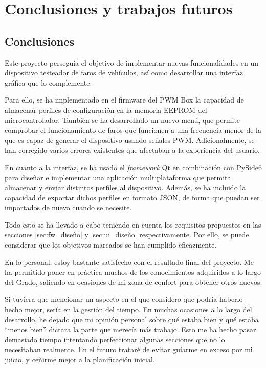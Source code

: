 \chapter{Conclusiones y trabajos futuros}

\section{Conclusiones}

Este proyecto perseguía el objetivo de implementar nuevas funcionalidades en un dispositivo testeador de faros de vehículos, así como desarrollar una interfaz gráfica que lo complemente.

Para ello, se ha implementado en el firmware del PWM Box la capacidad de almacenar perfiles de configuración en la memoria EEPROM del microcontrolador. También se ha desarrollado un nuevo menú, que permite comprobar el funcionamiento de faros que funcionen a una frecuencia menor de la que es capaz de generar el dispositivo usando señales PWM. Adicionalmente, se han corregido varios errores existentes que afectaban a la experiencia del usuario.

En cuanto a la interfaz, se ha usado el \textit{framework} Qt en combinación con PySide6 para diseñar e implementar una aplicación multiplataforma que permita almacenar y enviar distintos perfiles al dispositivo. Además, se ha incluido la capacidad de exportar dichos perfiles en formato JSON, de forma que puedan ser importados de nuevo cuando se necesite.

Todo esto se ha llevado a cabo teniendo en cuenta los requisitos propuestos en las secciones \ref{sec:fw_diseño} y \ref{sec:ui_diseño} respectivamente. Por ello, se puede considerar que los objetivos marcados se han cumplido eficazmente.

En lo personal, estoy bastante satisfecho con el resultado final del proyecto. Me ha permitido poner en práctica muchos de los conocimientos adquiridos a lo largo del Grado, saliendo en ocasiones de mi zona de confort para obtener otros nuevos.

Si tuviera que mencionar un aspecto en el que considero que podría haberlo hecho mejor, sería en la gestión del tiempo. En muchas ocasiones a lo largo del desarrollo, he dejado que mi opinión personal sobre qué estaba bien y qué estaba ``menos bien'' dictara la parte que merecía más trabajo. Esto me ha hecho pasar demasiado tiempo intentando perfeccionar algunas secciones que no lo necesitaban realmente. En el futuro trataré de evitar guiarme en exceso por mi juicio, y ceñirme mejor a la planificación inicial.

